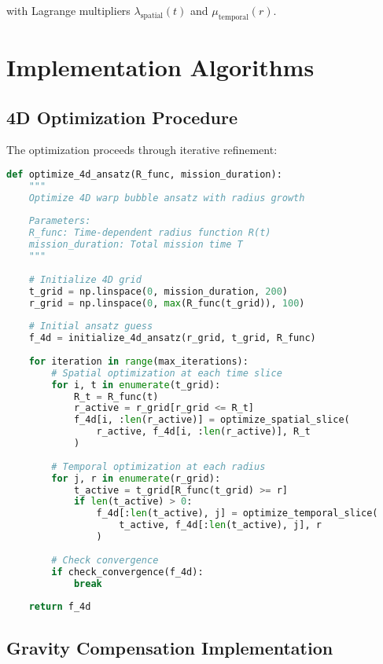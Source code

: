 \documentclass[12pt,a4paper]{article}
\begin{document}
with Lagrange multipliers $\lambda_{\text{spatial}}(t)$ and $\mu_{\text{temporal}}(r)$.

\section{Implementation Algorithms}

\subsection{4D Optimization Procedure}

The optimization proceeds through iterative refinement:

\begin{lstlisting}[language=Python]
def optimize_4d_ansatz(R_func, mission_duration):
    """
    Optimize 4D warp bubble ansatz with radius growth
    
    Parameters:
    R_func: Time-dependent radius function R(t)
    mission_duration: Total mission time T
    """
    
    # Initialize 4D grid
    t_grid = np.linspace(0, mission_duration, 200)
    r_grid = np.linspace(0, max(R_func(t_grid)), 100)
    
    # Initial ansatz guess
    f_4d = initialize_4d_ansatz(r_grid, t_grid, R_func)
    
    for iteration in range(max_iterations):
        # Spatial optimization at each time slice
        for i, t in enumerate(t_grid):
            R_t = R_func(t)
            r_active = r_grid[r_grid <= R_t]
            f_4d[i, :len(r_active)] = optimize_spatial_slice(
                r_active, f_4d[i, :len(r_active)], R_t
            )
        
        # Temporal optimization at each radius
        for j, r in enumerate(r_grid):
            t_active = t_grid[R_func(t_grid) >= r]
            if len(t_active) > 0:
                f_4d[:len(t_active), j] = optimize_temporal_slice(
                    t_active, f_4d[:len(t_active), j], r
                )
        
        # Check convergence
        if check_convergence(f_4d):
            break
    
    return f_4d
\end{lstlisting}

\subsection{Gravity Compensation Implementation}
\end{document}
